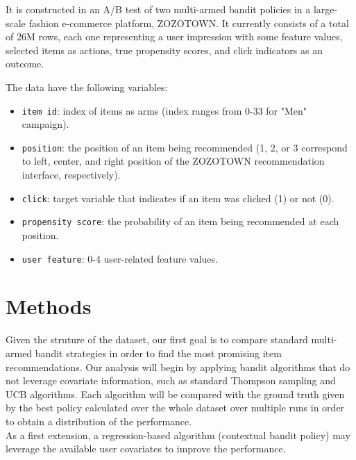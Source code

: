 \documentclass{article}
\begin{document}
It is constructed in an A/B test of two multi-armed bandit policies in a large-scale fashion e-commerce platform, ZOZOTOWN. It currently consists of a total of 26M rows, each one representing a user impression with some feature values, selected items as actions, true propensity scores, and click indicators as an outcome. 

The data have the following variables:
\begin{itemize}
    \item \texttt{item id}: index of items as arms (index ranges from 0-33 for "Men" campaign).
    \item \texttt{position}: the position of an item being recommended (1, 2, or 3 correspond to left, center, and right position of the ZOZOTOWN recommendation interface, respectively).
    \item \texttt{click}: target variable that indicates if an item was clicked (1) or not (0).
    \item \texttt{propensity score}: the probability of an item being recommended at each position.
    \item  \texttt{user feature}: 0-4 user-related feature values.
\end{itemize}



\section{Methods}
Given the struture of the dataset, our first goal is to compare standard multi-armed bandit strategies in order to find the most promising item recommendations.
Our analysis will begin by applying bandit algorithms that do not leverage covariate information, such as standard Thompson sampling and UCB algorithms.
Each algorithm will be compared with the ground truth given by the best policy calculated over the whole dataset over multiple runs in order to obtain a distribution of the performance. \\

As a first extension, a regression-based algorithm (contextual bandit policy) may leverage the available user covariates to improve the performance. 
\printbibliography
\end{document}
